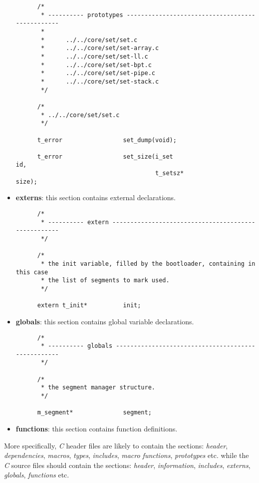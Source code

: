 \begin{itemize}
    \begin{verbatim}
      /*
       * ---------- prototypes ------------------------------------------------
       *
       *      ../../core/set/set.c
       *      ../../core/set/set-array.c
       *      ../../core/set/set-ll.c
       *      ../../core/set/set-bpt.c
       *      ../../core/set/set-pipe.c
       *      ../../core/set/set-stack.c
       */

      /*
       * ../../core/set/set.c
       */

      t_error                 set_dump(void);

      t_error                 set_size(i_set                          id,
                                       t_setsz*                       size);
    \end{verbatim}
  \item
    \textbf{externs}: this section contains external declarations.

    \begin{verbatim}
      /*
       * ---------- extern ----------------------------------------------------
       */

      /*
       * the init variable, filled by the bootloader, containing in this case
       * the list of segments to mark used.
       */

      extern t_init*          init;
    \end{verbatim}
  \item
    \textbf{globals}: this section contains global variable declarations.

    \begin{verbatim}
      /*
       * ---------- globals ---------------------------------------------------
       */

      /*
       * the segment manager structure.
       */

      m_segment*              segment;
    \end{verbatim}
  \item
    \textbf{functions}: this section contains function definitions.
\end{itemize}

More specifically, \textit{C} header files are likely to contain the sections:
\textit{header}, \textit{dependencies}, \textit{macros}, \textit{types},
\textit{includes}, \textit{macro functions}, \textit{prototypes} etc. while
the \textit{C} source files should contain the sections: \textit{header},
\textit{information}, \textit{includes}, \textit{externs}, \textit{globals},
\textit{functions} etc.

